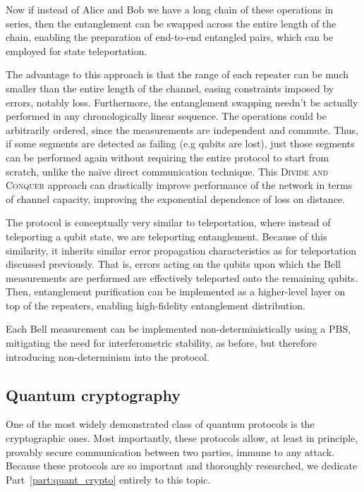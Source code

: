 Now if instead of Alice and Bob we have a long chain of these operations in series, then the entanglement can be swapped across the entire length of the chain, enabling the preparation of end-to-end entangled pairs, which can be employed for state teleportation.

The advantage to this approach is that the range of each repeater can be much smaller than the entire length of the channel, easing constraints imposed by errors, notably loss. Furthermore, the entanglement swapping needn't be actually performed in any chronologically linear sequence. The operations could be arbitrarily ordered, since the measurements are independent and commute. Thus, if some segments are detected as failing (e.g qubits are lost), just those segments can be performed again without requiring the entire protocol to start from scratch, unlike the na{\" i}ve direct communication technique. This \textsc{Divide and Conquer} approach can drastically improve performance of the network in terms of channel capacity, improving the exponential dependence of loss on distance. 

The protocol is conceptually very similar to teleportation, where instead of teleporting a qubit state, we are teleporting entanglement. Because of this similarity, it inherits similar error propagation characteristics as for teleportation discussed previously. That is, errors acting on the qubits upon which the Bell measurements are performed are effectively teleported onto the remaining qubits. Then, entanglement purification can be implemented as a higher-level layer on top of the repeaters, enabling high-fidelity entanglement distribution.

Each Bell measurement can be implemented non-deterministically using a PBS, mitigating the need for interferometric stability, as before, but therefore introducing non-determinism into the protocol.

%
%

\subsection{Quantum cryptography}\label{sec:QKD_prot}

One of the most widely demonstrated class of quantum protocols is the cryptographic ones. Most importantly, these protocols allow, at least in principle, provably secure communication between two parties, immune to any attack. Because these protocols are so important and thoroughly researched, we dedicate Part~\ref{part:quant_crypto} entirely to this topic.

